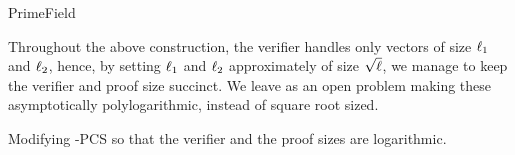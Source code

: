 \begin{lncsmove}{PrimeField}
\begin{remark}
Throughout the above construction, the verifier handles only vectors of size $\ell_1$ and $\ell_2$, hence, by setting $\ell_1$ and $\ell_2$ approximately of size $\sqrt{\ell}$, we manage to keep the verifier and proof size succinct. We leave as an open problem making these asymptotically polylogarithmic, instead of square root sized. 
\end{remark}


\begin{remark}
    Modifying \ftwoz-PCS so that the verifier and the proof sizes are logarithmic. 

    
\end{remark}

\end{lncsmove}
